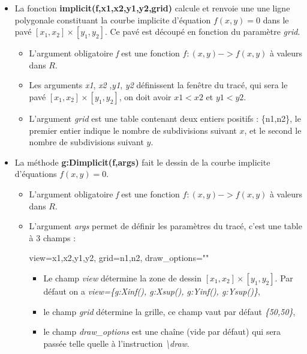 \begin{itemize}
\item La fonction \textbf{implicit(f,x1,x2,y1,y2,grid)} calcule et renvoie une une ligne polygonale constituant la courbe implicite d'équation $f(x,y)=0$ dans le pavé $[x_1,x_2]\times[y_1,y_2]$. Ce pavé est découpé en fonction du paramètre \emph{grid}.

      \begin{itemize}
      \item L'argument obligatoire \emph{f} est une fonction \(f: (x,y) -> f(x,y)\) à valeurs dans \(R\).
      \item Les arguments \emph{x1}, \emph{x2} ,\emph{y1}, \emph{y2} définissent la fenêtre du tracé, qui sera le pavé $[x_1,x_2]\times[y_1,y_2]$, on doit avoir \(x1<x2\) et \(y1<y2\).
      \item L'argument \emph{grid} est une table contenant deux entiers positifs : \{n1,n2\}, le premier entier indique le nombre de subdivisions suivant $x$, et le second le nombre de subdivisions suivant $y$.
      \end{itemize}
  
\item La méthode \textbf{g:Dimplicit(f,args)} fait le dessin de la courbe implicite d'équations $f(x,y)=0$.

      \begin{itemize}
      \item L'argument obligatoire \emph{f} est une fonction \(f: (x,y) -> f(x,y)\) à valeurs dans \(R\).
      \item   L'argument \emph{args} permet de définir les paramètres du tracé, c'est une table à 3 champs :
      
      \begin{TeXcode}
      { view={x1,x2,y1,y2}, grid={n1,n2}, draw_options="" }
      \end{TeXcode}
            \begin{itemize}
                \item Le champ \emph{view} détermine la zone de dessin $[x_1,x_2]\times[y_1,y_2]$.  Par défaut on a \emph{view=\{g:Xinf(), g:Xsup(), g:Yinf(), g:Ysup()\}},
                \item le champ \emph{grid} détermine la grille, ce champ vaut par défaut \emph{\{50,50\}},
                \item le champ \emph{draw\_options} est une chaîne (vide par défaut) qui sera passée telle quelle à l'instruction \emph{\textbackslash draw}.
            \end{itemize}
      \end{itemize}
\end{itemize}

